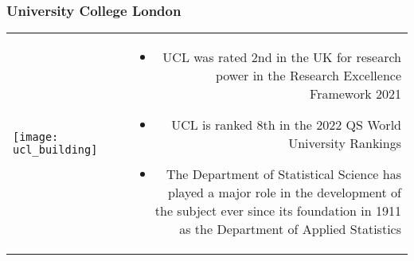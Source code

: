 
\begin{frame}
\frametitle{University College London}
\begin{tabular}{lcr}
\begin{minipage}[l]{5.0cm}
\texttt{[image: ucl\_building]}
\end{minipage} & &
\begin{minipage}[r]{6.5cm}
\begin{itemize}
\item UCL was rated 2nd in the UK for research power in the Research Excellence Framework 2021
\item UCL is ranked 8th in the 2022 QS World University Rankings
\item The Department of Statistical Science has played a major role in the development of the subject ever since its foundation in 1911 as the Department of Applied Statistics
\end{itemize}
\end{minipage}
\end{tabular}
\end{frame}


